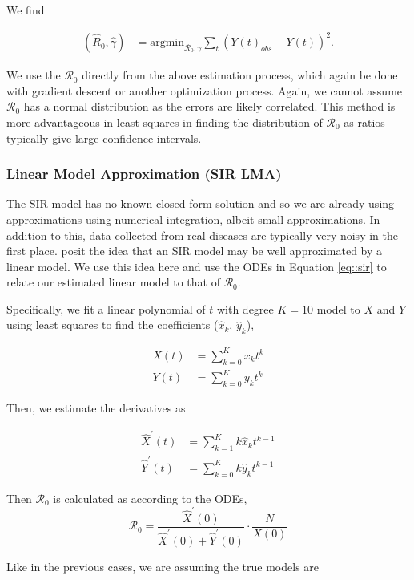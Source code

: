 \documentclass[12pt]{article}
\newcommand{\rr}{\ensuremath{\mathcal{R}_0}}
\begin{document}
We find

\begin{align*}
(\hat{R}_0, \hat{\gamma} )&=\text{argmin}_{\rr, \gamma} \sum_{t} (Y(t)_{obs} - Y(t))^2 .
\end{align*}

We use the \(\rr\) directly from the above estimation process, which again be done with gradient descent or another optimization process.  Again, we cannot assume $\rr$ has a normal distribution as the errors are likely correlated.  This method is more advantageous in least squares in finding the distribution of $\rr$ as ratios typically give large confidence intervals.



\subsubsection{Linear Model Approximation (SIR LMA)}\label{linear-model-approximation-degree-10}

The SIR model has no known closed form solution and so we are already using approximations using numerical integration, albeit small approximations.  In addition to this, data collected from real diseases are typically very noisy in the first place.  \cite{chang2017} posit the idea that an SIR model may be well approximated by a linear model.  We use this idea here and use the ODEs in Equation \eqref{eq::sir} to relate our estimated linear model to that of $\rr$.

Specifically, we fit a linear polynomial of \(t\) with degree \(K= 10\) model to \(X\)
and \(Y\) using least squares to find the coefficients (\(\hat{x}_k\),
\(\hat{y}_k\)),

\begin{align*}
X(t) &= \sum_{k=0}^K x_k t^k\\
{Y}(t) &= \sum_{k=0}^K y_k t^k
\end{align*}

Then, we estimate the derivatives as

\begin{align*}
\hat{X}^\prime(t) &= \sum_{k=1}^K k \hat{x}_k t^{k-1}\\
\hat{Y}^\prime(t) &= \sum_{k=0}^K k \hat{y}_k t^{k-1}
\end{align*}

Then \(\rr\) is calculated as according to the ODEs,
\[\rr = \frac{\hat{X}^\prime(0)}{ \hat{X}^\prime(0) + \hat{Y}^\prime(0)} \cdot \frac{N}{X(0)} \]

Like in the previous cases, we are assuming the true models are
\end{document}
